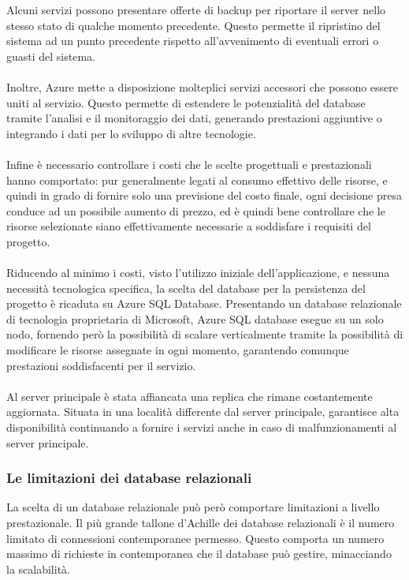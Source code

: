 Alcuni servizi possono presentare offerte di backup per riportare il server nello stesso stato di qualche momento precedente. 
Questo permette il ripristino del sistema ad un punto precedente rispetto all’avvenimento di eventuali errori o guasti del sistema.\\
\\

Inoltre, Azure mette a disposizione molteplici servizi accessori che possono essere uniti al servizio. 
Questo permette di estendere le potenzialità del database tramite  l’analisi e il monitoraggio dei dati, 
generando prestazioni aggiuntive o integrando i dati per lo sviluppo di altre tecnologie.\\
\\
Infine è necessario controllare i costi che le scelte progettuali e prestazionali hanno comportato: 
pur generalmente legati al consumo effettivo delle risorse, e quindi in grado di fornire solo una previsione del costo finale, 
ogni decisione presa conduce ad un possibile aumento di prezzo, 
ed è quindi bene controllare che le risorse selezionate siano effettivamente  necessarie a soddisfare i requisiti del progetto.\\
\\
Riducendo al minimo i costi, visto l’utilizzo iniziale dell’applicazione, e nessuna necessità tecnologica specifica, 
la scelta del database per la persistenza del progetto è ricaduta su Azure SQL Database. 
Presentando un database relazionale di tecnologia proprietaria di Microsoft, Azure SQL database esegue su un solo nodo, 
fornendo però la possibilità di  scalare  verticalmente tramite la possibilità di modificare le risorse assegnate in ogni momento, 
garantendo comunque prestazioni soddisfacenti per il servizio.\\
\\
Al server principale è stata affiancata una replica che rimane costantemente aggiornata. 
Situata in una località differente dal server principale, garantisce alta disponibilità continuando a fornire i servizi anche in caso di malfunzionamenti al server principale.
\clearpage
\subsubsection{Le limitazioni dei database relazionali}

La scelta di un database relazionale può però comportare limitazioni a livello prestazionale. 
Il più grande tallone d'Achille dei database relazionali è il numero limitato di connessioni contemporanee permesso. 
Questo comporta un numero massimo di richieste in contemporanea che il database può gestire, minacciando la scalabilità. \\
\\

